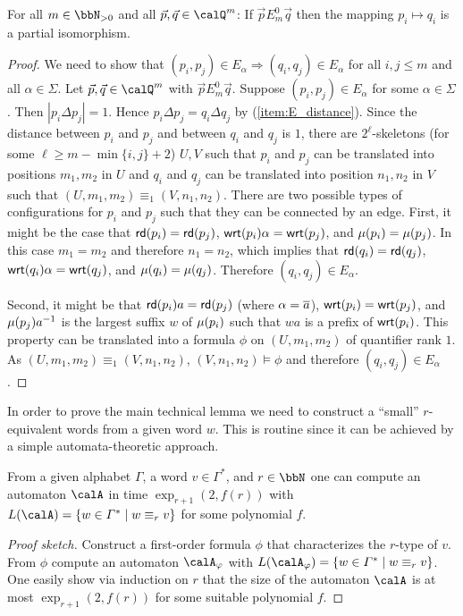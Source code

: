 \begin{lemma}\label{lem:partial_isomorphism}
	For all $m\in\bbN_{>0}$ and all $\vec{p},\vec{q} \in \Qx^m$: If $\vec{p} E^0_m \vec{q}$ then the mapping $p_i \mapsto q_i$ is a partial isomorphism.
\end{lemma}
\begin{proof}
	We need to show that $(p_i,p_j)\in E_\alpha \Rightarrow (q_i,q_j)\in E_\alpha$  for all $i,j\leq m$ and all $\alpha\in \Sigma$.
	Let $\vec{p}, \vec{q} \in \Qx^m$ with $\vec{p} E^0_m \vec{q}$. Suppose  $(p_i,p_j) \in E_\alpha$ for some $\alpha\in\Sigma$. Then $|p_i\Delta p_j| = 1$. Hence $p_i\Delta p_j = q_i\Delta q_j$ by (\ref{item:E_distance}). 
	Since the distance between $p_i$ and $p_j$ and between $q_i$ and $q_j$ is $1$, there are $2^\ell$-skeletons (for some $\ell \geq m-\min\{i,j\}+2$) $U,V$ such that 
	$p_i$ and $p_j$ can be translated into positions $m_1, m_2$ in $U$ and $q_i$ and $q_j$ can be translated into position $n_1,n_2$ in $V$ such that $(U,m_1,m_2) \equiv_1 (V,n_1,n_2)$. 
	There are two possible types of configurations for $p_i$ and $p_j$ such that they can be connected by an edge. First, it might be the case  that $\mathsf{rd}(p_i) = \mathsf{rd}(p_j)$,
	$\mathsf{wrt}(p_i)\alpha = \mathsf{wrt}(p_j)$, and $\mu(p_i) = \mu(p_j)$. In this case $m_1=m_2$ and therefore $n_1=n_2$, which implies that $\mathsf{rd}(q_i) = \mathsf{rd}(q_j)$,
	$\mathsf{wrt}(q_i)\alpha = \mathsf{wrt}(q_j)$, and $\mu(q_i) = \mu(q_j)$. Therefore $(q_i,q_j) \in E_\alpha$.
	
	Second, it might be that $\mathsf{rd}(p_i)a = \mathsf{rd}(p_j)$ (where $\alpha=\overline{a}$),
	$\mathsf{wrt}(p_i) = \mathsf{wrt}(p_j)$, and $\mu(p_j)a^{-1}$ is the largest suffix $w$ of $\mu(p_i)$ such that $wa$ is a prefix of $\mathsf{wrt}(p_i)$.  This property can be translated into a formula $\phi$
	on $(U, m_1, m_2)$ of quantifier rank $1$. As $(U,m_1,m_2) \equiv_1 (V, n_1,n_2)$, $(V,n_1,n_2) \models \phi$ and therefore $(q_i,q_j)\in E_\alpha$.
\end{proof}

In order to prove the main technical lemma we need to construct a ``small'' $r$-equivalent words from a given word $w$. This is routine since it can be achieved by a simple automata-theoretic approach.
\begin{lemma}\label{lem:r-equiv_word_construction}
	From a given alphabet $\Gamma$, a word $v\in\Gamma^\ast$, and $r\in\bbN$ one can compute an automaton $\calA$ in time $\exp_{r+1}(2, f(r))$ with $L(\calA) = \{w\in \Gamma^\ast\mid w\equiv_r v \}$ for some polynomial $f$.
\end{lemma}
\begin{proof}[Proof sketch]
	Construct a first-order formula $\phi$ that characterizes the $r$-type of $v$. From $\phi$ compute an automaton $\calA_\phi$ with $L(\calA_\phi) = \{ w\in\Gamma^\ast \mid w\equiv_r v \}$. One easily show via induction on $r$ that the size of the automaton $\calA$ is at most
	$\exp_{r+1}(2, f(r))$ for some suitable polynomial $f$.
\end{proof}


